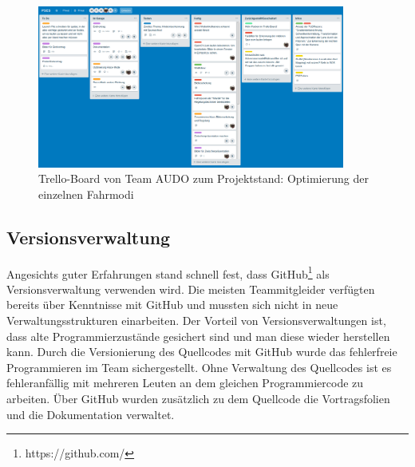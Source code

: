 \begin{figure}[h]
	\centering
	\includegraphics[width=0.9\textwidth]{images/Trello.png}
	\caption{Trello-Board von Team AUDO zum Projektstand: Optimierung der einzelnen Fahrmodi}
	\label{abb:trello-board}
\end{figure}


\subsection{Versionsverwaltung}
\label{sec:versionsverwaltung}
Angesichts guter Erfahrungen stand schnell fest, dass GitHub\footnote{https://github.com/} als Versionsverwaltung verwenden wird. Die meisten Teammitgleider verfügten bereits über Kenntnisse mit GitHub und mussten sich nicht in neue Verwaltungsstrukturen einarbeiten. Der Vorteil von Versionsverwaltungen ist, dass alte Programmierzustände gesichert sind und man diese wieder herstellen kann. Durch die Versionierung des Quellcodes mit GitHub wurde das fehlerfreie Programmieren im Team sichergestellt. Ohne Verwaltung des Quellcodes ist es fehleranfällig  mit mehreren Leuten an dem gleichen Programmiercode zu arbeiten.
Über GitHub wurden zusätzlich zu dem Quellcode die Vortragsfolien und die Dokumentation verwaltet.